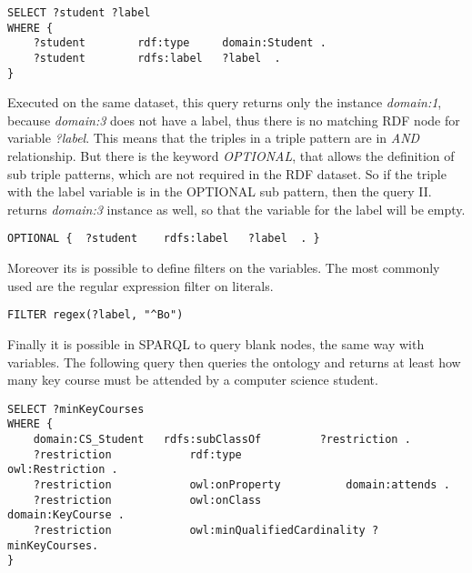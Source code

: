 \begin{lstlisting}[captionpos=b, caption=SPARQL Query II., label=2nd:sparql, belowskip=1em, aboveskip=2em,
basicstyle=\footnotesize,frame=single]
SELECT ?student ?label 
WHERE { 
	?student		rdf:type	 domain:Student .	
	?student		rdfs:label	 ?label  .
}
\end{lstlisting}

Executed on the same dataset, this query returns only the instance \textit{domain:1}, because \textit{domain:3} does not have a label, thus there is no matching RDF node for variable \textit{?label}. This means that the triples in a triple pattern are in \textit{AND} relationship. But there is the keyword \textit{OPTIONAL}, that allows the definition of sub triple patterns, which are not required in the RDF dataset. So if the triple with the label variable is in the OPTIONAL sub pattern, then the query II. returns \textit{domain:3} instance as well, so that the variable for the label will be empty.

\begin{lstlisting}[captionpos=b, caption=Optional sub triple pattern., label=2nd:sparql, belowskip=1em, aboveskip=2em,
basicstyle=\footnotesize,frame=single]
OPTIONAL { 	?student	rdfs:label	 ?label  . } 
\end{lstlisting}

Moreover its is possible to define filters on the variables. The most commonly used are the regular expression filter on literals. 

\begin{lstlisting}[captionpos=b, caption=Regex filter in SPARQL, label=2nd:sparql, belowskip=1em, aboveskip=2em,
basicstyle=\footnotesize,frame=single]
FILTER regex(?label, "^Bo")
\end{lstlisting}

Finally it is possible in SPARQL to query blank nodes, the same way with variables. The following query then queries the ontology and returns at least how many key course must be attended by a computer science student.

\begin{lstlisting}[captionpos=b, caption=SPARQL Query III., label=3rd:sparql, belowskip=1em, aboveskip=2em,
basicstyle=\footnotesize,frame=single]
SELECT ?minKeyCourses
WHERE {
	domain:CS_Student	rdfs:subClassOf			?restriction .
	?restriction			rdf:type						owl:Restriction .
	?restriction			owl:onProperty			domain:attends .
	?restriction			owl:onClass					domain:KeyCourse .
	?restriction			owl:minQualifiedCardinality	?minKeyCourses.
}
\end{lstlisting}


